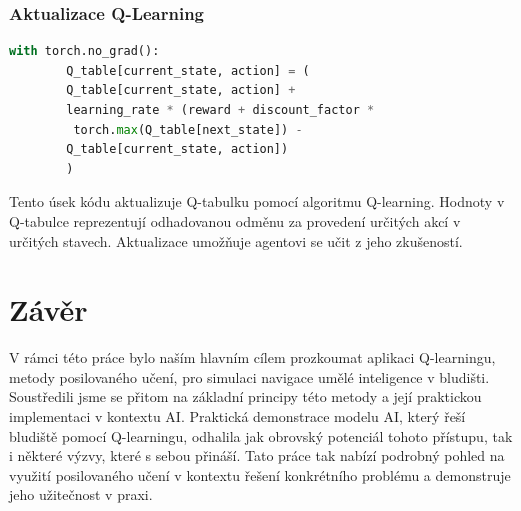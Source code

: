 \documentclass[12pt, a4paper,
twoside,        %
openright
]{report}
\begin{document}
\newpage
\subsection{Aktualizace Q-Learning}
\begin{lstlisting}[language=Python]
	with torch.no_grad():
		Q_table[current_state, action] = (
		Q_table[current_state, action] + 
		learning_rate * (reward + discount_factor *
		 torch.max(Q_table[next_state]) - 
		Q_table[current_state, action])
		)
\end{lstlisting}
Tento úsek kódu aktualizuje Q-tabulku pomocí algoritmu Q-learning. Hodnoty v Q-tabulce reprezentují odhadovanou odměnu za provedení určitých akcí v určitých stavech. Aktualizace umožňuje agentovi se učit z jeho zkušeností.



	
	\chapter*{Závěr}
	
	V rámci této práce bylo naším hlavním cílem prozkoumat aplikaci Q-learningu, metody posilovaného učení, pro simulaci navigace umělé inteligence v bludišti. Soustředili jsme se přitom na základní principy této metody a její praktickou implementaci v kontextu AI. Praktická demonstrace modelu AI, který řeší bludiště pomocí Q-learningu, odhalila jak obrovský potenciál tohoto přístupu, tak i některé výzvy, které s sebou přináší. Tato práce tak nabízí podrobný pohled na využití posilovaného učení v kontextu řešení konkrétního problému a demonstruje jeho užitečnost v praxi.
	
\end{document}
